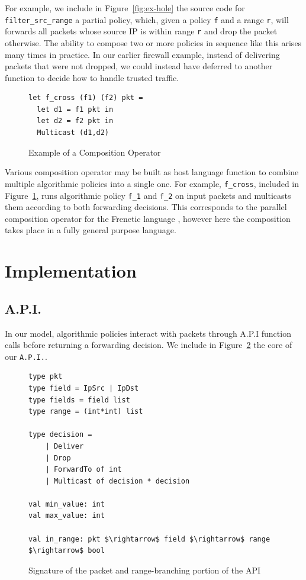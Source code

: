 \documentclass[preprint]{sigplanconf}
\begin{document}
   
   For example, we include in Figure~\ref{fig:ex-hole} the source code for \lstinline|filter_src_range| a partial policy, which, given a policy \lstinline|f| and a range \lstinline|r|, will forwards all packets whose source IP is within range \lstinline|r| and drop the packet otherwise. The ability to compose two or more policies in sequence like this arises many times in practice. In our earlier firewall example, instead of delivering packets that were not dropped, we could instead have deferred to another function to decide how to handle trusted traffic.


   \begin{figure}[ht]
\begin{lstlisting}
let f_cross (f1) (f2) pkt =
  let d1 = f1 pkt in
  let d2 = f2 pkt in
  Multicast (d1,d2)
\end{lstlisting}

\caption{Example of a Composition Operator}
\label{fig:ex-cross}
\end{figure}
   
Various composition operator may be built as host language function to combine multiple algorithmic policies into a single one. For example, \lstinline|f_cross|, included in Figure~\ref{fig:ex-cross}, runs algorithmic policy \lstinline|f_1| and \lstinline|f_2| on input packets and multicasts them according to both forwarding decisions. This corresponds to the parallel composition operator for the Frenetic language \cite{Frenetic}, however here the composition takes place in a fully general purpose language.
   
\section*{Implementation}

\subsection*{A.P.I.}
In our model, algorithmic policies interact with packets through A.P.I function calls before returning a forwarding decision. We include in Figure~\ref{fig:range_api} the core of our \lstinline|A.P.I.|.

\begin{figure}[ht]
  \begin{lstlisting}[mathescape]
type pkt
type field = IpSrc | IpDst 
type fields = field list
type range = (int*int) list

type decision =
	| Deliver
	| Drop
	| ForwardTo of int
	| Multicast of decision * decision

val min_value: int 
val max_value: int

val in_range: pkt $\rightarrow$ field $\rightarrow$ range $\rightarrow$ bool
\end{lstlisting}

\caption{Signature of the packet and range-branching portion of the API}
\label{fig:range_api}
\end{figure}
\end{document}
